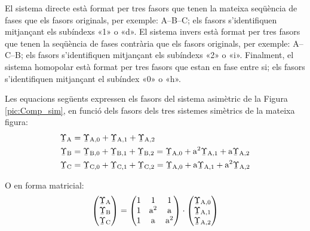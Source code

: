 \begin{center}
    
    \label{pic:Comp_sim}
\end{center}

 
 El sistema directe està format per tres
fasors que tenen la mateixa seqüència de fases que els fasors
originals, per exemple: A--B--C; els fasors
s'identifiquen mitjançant els subíndexs «1» o «d». El sistema
invers està format per tres fasors que tenen la seqüència de fases contrària
 que els fasors originals, per exemple: A--C--B; els fasors s'identifiquen mitjançant els
subíndexs «2» o «i». Finalment, el sistema homopolar està
format per tres fasors que estan en fase entre si; els fasors
s'identifiquen mitjançant el subíndex «0» o «h».

Les equacions següents expressen els fasors del sistema asimètric de la Figura \vref{pic:Comp_sim}, en funció
dels fasors dels tres sistemes simètrics de la mateixa figura:
\begin{subequations}
\begin{align}
   \cmplx{\Upsilon}\ped{A} &= \cmplx{\Upsilon}\ped{A,0}  +
   \cmplx{\Upsilon}\ped{A,1} + \cmplx{\Upsilon}\ped{A,2} \label{eq:c_sim_a}\\
   \cmplx{\Upsilon}\ped{B} &= \cmplx{\Upsilon}\ped{B,0} + \cmplx{\Upsilon}\ped{B,1} +
   \cmplx{\Upsilon}\ped{B,2}  =  \cmplx{\Upsilon}\ped{A,0} + \au^2
   \cmplx{\Upsilon}\ped{A,1} + \au \cmplx{\Upsilon}\ped{A,2} \label{eq:c_sim_b}\\
   \cmplx{\Upsilon}\ped{C} &= \cmplx{\Upsilon}\ped{C,0} + \cmplx{\Upsilon}\ped{C,1} +
   \cmplx{\Upsilon}\ped{C,2}  = \cmplx{\Upsilon}\ped{A,0} + \au
   \cmplx{\Upsilon}\ped{A,1} + \au^2 \cmplx{\Upsilon}\ped{A,2} \label{eq:c_sim_c}
\end{align}
\end{subequations}

O en forma matricial:
\begin{equation}\label{eq:c_sim_mat}
   \begin{pmatrix}
     \cmplx{\Upsilon}\ped{A} \\
     \cmplx{\Upsilon}\ped{B} \\
     \cmplx{\Upsilon}\ped{C}
   \end{pmatrix} =
   \begin{pmatrix}
     1 & 1 & 1 \\
     1 & \au^2 & \au\\
     1 & \au & \au^2
   \end{pmatrix} \cdot
   \begin{pmatrix}
     \cmplx{\Upsilon}\ped{A,0} \\
     \cmplx{\Upsilon}\ped{A,1} \\
     \cmplx{\Upsilon}\ped{A,2}
   \end{pmatrix}
\end{equation}

